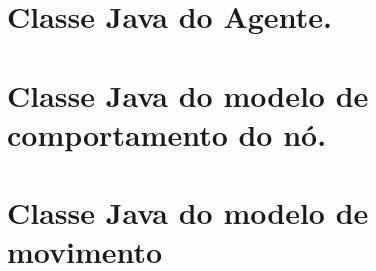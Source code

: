 \documentclass{uflamon-22}          %
\begin{document}


   
\newpage 

\appendix

\section{Classe Java do Agente.}
\label{app:agente}


\section{Classe Java do modelo de comportamento do nó.}
\label{app:comportamentoNo}



\section{Classe Java do modelo de movimento}
\label{app:movimento}


\end{document}
